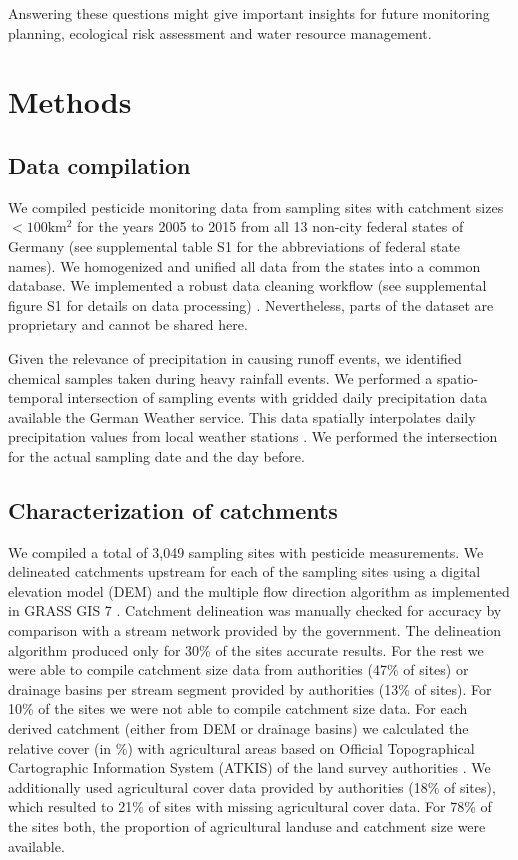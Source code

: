 \documentclass[journal=esthag,manuscript=article]{achemso}
\begin{document}
Answering these questions might give important insights for future monitoring planning, ecological risk assessment and water resource management.




\section{Methods}
\subsection{Data compilation}
We compiled pesticide monitoring data from sampling sites with catchment sizes $\mathrm{< 100km^2}$ for the years 2005 to 2015 from all 13 non-city federal states of Germany (see supplemental table S1 for the abbreviations of federal state names). 
We homogenized and unified all data from the states into a common database.
We implemented a robust data cleaning workflow (see supplemental figure S1 for details on data processing) \citep{poisot_best_2015}.
Nevertheless, parts of the dataset are proprietary and cannot be shared here.

Given the relevance of precipitation in causing runoff events, we identified chemical samples taken during heavy rainfall events.
We performed a spatio-temporal intersection of sampling events with gridded daily precipitation data available the German Weather service.
This data spatially interpolates daily precipitation values from local weather stations \citep{rauthe_central_2013}. 
We performed the intersection for the actual sampling date and the day before.

\subsection{Characterization of catchments}
We compiled a total of 3,049 sampling sites with pesticide measurements.
We delineated catchments upstream for each of the sampling sites using a digital elevation model (DEM) \citep{eea_digital_2013} and the multiple flow direction algorithm \citep{holmgren_multiple_1994} as implemented in GRASS GIS 7 \citep{neteler_grass_2012}.
Catchment delineation was manually checked for accuracy by comparison with a stream network provided by the government.
The delineation algorithm produced only for 30\% of the sites accurate results.
For the rest we were able to compile catchment size data from authorities (47\% of sites) or drainage basins per stream segment provided by authorities (13\% of sites).
For 10\% of the sites we were not able to compile catchment size data.
For each derived catchment (either from DEM or drainage basins) we calculated the relative cover (in \%) with agricultural areas based on Official Topographical Cartographic Information System (ATKIS) of the land survey authorities \citep{adv_atkis_2016}.
We additionally used agricultural cover data provided by authorities (18\% of sites), which resulted to 21\% of sites with missing agricultural cover data. 
For 78\% of the sites both, the proportion of agricultural landuse and catchment size were available.
\end{document}
